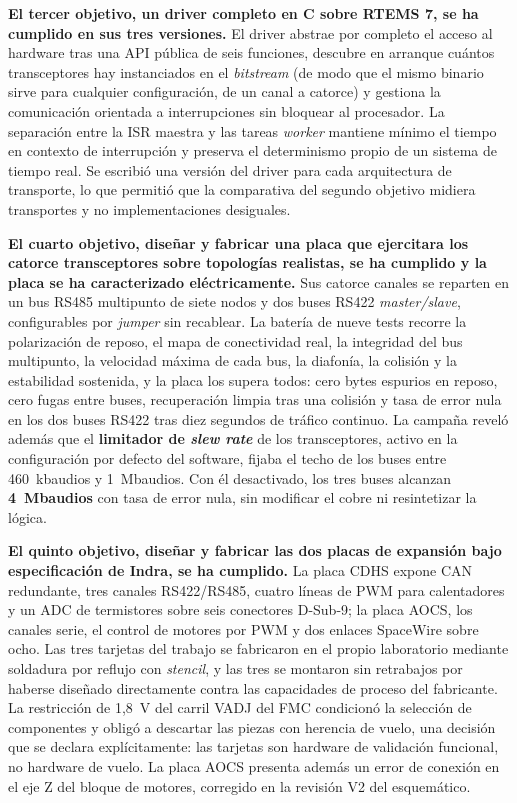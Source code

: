 \textbf{El tercer objetivo, un driver completo en C sobre RTEMS 7, se ha cumplido en sus tres
versiones.} El driver abstrae por completo el acceso al hardware tras una API pública de seis
funciones, descubre en arranque cuántos transceptores hay instanciados en el \textit{bitstream}
(de modo que el mismo binario sirve para cualquier configuración, de un canal a catorce) y gestiona
la comunicación orientada a interrupciones sin bloquear al procesador. La separación entre la ISR
maestra y las tareas \textit{worker} mantiene mínimo el tiempo en contexto de interrupción y
preserva el determinismo propio de un sistema de tiempo real. Se escribió una versión del driver
para cada arquitectura de transporte, lo que permitió que la comparativa del segundo objetivo
midiera transportes y no implementaciones desiguales.

\textbf{El cuarto objetivo, diseñar y fabricar una placa que ejercitara los catorce transceptores
sobre topologías realistas, se ha cumplido y la placa se ha caracterizado eléctricamente.} Sus
catorce canales se reparten en un bus RS485 multipunto de siete nodos y dos buses RS422
\textit{master/slave}, configurables por \textit{jumper} sin recablear. La batería de nueve tests
recorre la polarización de reposo, el mapa de conectividad real, la integridad del bus multipunto,
la velocidad máxima de cada bus, la diafonía, la colisión y la estabilidad sostenida, y la placa
los supera todos: cero bytes espurios en reposo, cero fugas entre buses, recuperación limpia tras
una colisión y tasa de error nula en los dos buses RS422 tras diez segundos de tráfico continuo.
La campaña reveló además que el \textbf{limitador de \textit{slew rate}} de los transceptores, activo
en la configuración por defecto del software, fijaba el techo de los buses entre 460~kbaudios y
1~Mbaudios. Con él desactivado, los tres buses alcanzan \textbf{4~Mbaudios} con tasa de error nula,
sin modificar el cobre ni resintetizar la lógica.

\textbf{El quinto objetivo, diseñar y fabricar las dos placas de expansión bajo especificación de
Indra, se ha cumplido.} La placa CDHS expone CAN redundante, tres canales RS422/RS485, cuatro
líneas de PWM para calentadores y un ADC de termistores sobre seis conectores D-Sub-9; la placa
AOCS, los canales serie, el control de motores por PWM y dos enlaces SpaceWire sobre ocho. Las tres
tarjetas del trabajo se fabricaron en el propio laboratorio mediante soldadura por reflujo con
\textit{stencil}, y las tres se montaron sin retrabajos por haberse diseñado directamente contra
las capacidades de proceso del fabricante. La restricción de 1,8~V del carril VADJ del FMC
condicionó la selección de componentes y obligó a descartar las piezas con herencia de vuelo, una
decisión que se declara explícitamente: las tarjetas son hardware de validación funcional, no
hardware de vuelo. La placa AOCS presenta además un error de conexión en el eje Z del bloque de
motores, corregido en la revisión V2 del esquemático.

